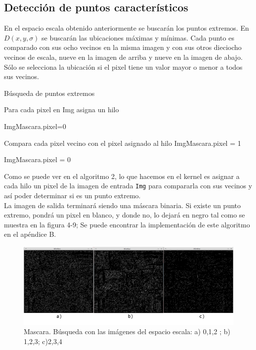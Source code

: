 \subsection{Detección de puntos característicos}
En el espacio escala obtenido anteriormente se buscarán los puntos extremos. En $D(x,y,\sigma)$ se buscarán las ubicaciones máximas y mínimas. Cada punto es comparado con sus ocho vecinos en la misma imagen y con sus otros dieciocho vecinos de escala, nueve en la imagen de arriba y nueve en la imagen de abajo. Sólo se selecciona la ubicación si el pixel tiene un valor mayor o menor a todos sus vecinos.\\
\begin{algorithm}[H]
\caption{Búsqueda de puntos extremos}
 Para cada pixel en Img asigna un hilo\;
 
 {
	{
		ImgMascara.pixel=0\;
	}{
		{
			Compara cada pixel vecino con el pixel asignado al hilo\;
			{
				ImgMascara.pixel = 1\;			
			}{
				ImgMascara.pixel = 0\;
			
			}
		
		}
		
	}
 }
\end{algorithm}
Como se puede ver en el algoritmo 2, lo que hacemos en el kernel es asignar a cada hilo un pixel de la imagen de entrada \texttt{Img} para compararla con sus vecinos y así poder determinar si es un punto extremo.\\
La imagen de salida terminará siendo una máscara binaria. Si existe un punto extremo, pondrá un pixel en blanco, y donde no, lo dejará en negro tal como se muestra en la figura 4-9; Se puede encontrar la implementación de este algoritmo en el apéndice B.
\begin{figure}[H]
			\centering
				\includegraphics[width=\textwidth]{img/minmaxs.jpg}
			\caption{Mascara.  Búsqueda con las imágenes del espacio escala: a) 0,1,2 ; b) 1,2,3; c)2,3,4  }
\end{figure} 
